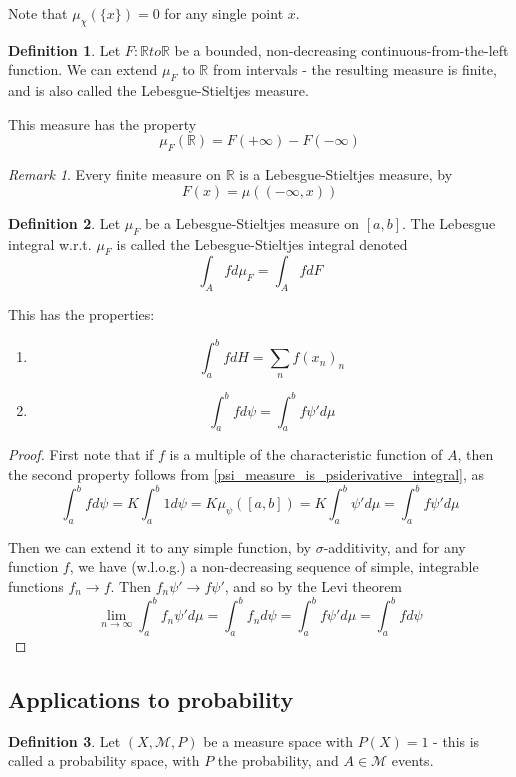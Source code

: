 \documentclass[11pt,a4paper]{report}
\theoremstyle{plain}
\theoremstyle{definition}
\newtheorem*{defn}{Definition}
\theoremstyle{remark}
\newtheorem*{rem}{Remark}
\newcommand{\R}{\mathbb{R}}
\newcommand{\cM}{\mathcal{M}}
\begin{document}
Note that $\mu_\chi(\{x\}) = 0$ for any single point $x$.

\begin{defn}
  Let $F : \R to \R$ be a bounded, non-decreasing continuous-from-the-left function. We can extend $\mu_F$ to $\R$ from intervals - the resulting measure is finite, and is also called the Lebesgue-Stieltjes measure.
  
  This measure has the property
  $$ \mu_F(\R) = F(+\infty) - F(-\infty) $$
\end{defn}

\begin{rem}
  Every finite measure on $\R$ is a Lebesgue-Stieltjes measure, by
  $$ F(x) = \mu((-\infty, x)) $$
\end{rem}

\begin{defn}
  Let $\mu_F$ be a Lebesgue-Stieltjes measure on $[a, b]$. The Lebesgue integral w.r.t. $\mu_F$ is called the Lebesgue-Stieltjes integral denoted
  $$ \int_A f d\mu_F = \int_A f dF $$
\end{defn}

This has the properties:
\begin{enumerate}
    \item $$ \int_a^b f dH = \sum_n f(x_n)_n $$
    \item $$ \int_a^b f d\psi = \int_a^b f\psi' d\mu $$
\end{enumerate}

\begin{proof}
  First note that if $f$ is a multiple of the characteristic function of $A$, then the second property follows from \ref{psi_measure_is_psiderivative_integral}, as
  $$ \int_a^b f d\psi = K \int_a^b 1 d\psi = K\mu_\psi([a, b]) = K\int_a^b \psi'd\mu = \int_a^b f\psi' d\mu $$
  
  Then we can extend it to any simple function, by $\sigma$-additivity, and for any function $f$, we have (w.l.o.g.) a non-decreasing sequence of simple, integrable functions $f_n \to f$. Then $f_n\psi' \to f\psi'$, and so by the Levi theorem
  $$ \lim_{n \to \infty} \int_a^b f_n\psi' d\mu = \int_a^b f_n d\psi = \int_a^b f\psi' d\mu = \int_a^b f d\psi $$
\end{proof}

\subsection{Applications to probability}

\begin{defn}
Let $(X, \cM, P)$ be a measure space with $P(X) = 1$ - this is called a probability space, with $P$ the probability, and $A \in \cM$ events.
\end{defn}
\end{document}
